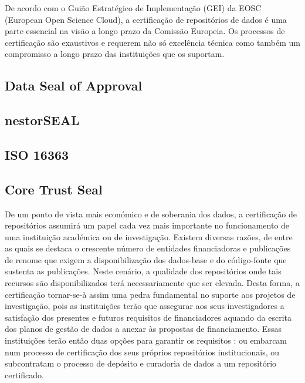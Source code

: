 \documentclass[sigconf,nonacm]{acmart}
\begin{document}
De acordo com o Guião Estratégico de Implementação (GEI) da EOSC (European Open Science Cloud), a certificação de repositórios de dados é uma parte essencial na visão a longo prazo da Comissão Europeia. Os processos de certificação são exaustivos e requerem não só excelência técnica como também um compromisso a longo prazo das instituições que os suportam. 

\subsection{Data Seal of Approval} %
\label{sub:data_seal_of_approval}


\subsection{nestorSEAL} %
\label{sub:nestorseal}


\subsection{ISO 16363} %
\label{sub:iso_16363}


\subsection{Core Trust Seal} %
\label{sub:core_trust_seal}



De um ponto de vista mais económico e de soberania dos dados, a certificação de repositórios assumirá um papel cada vez mais importante no funcionamento de uma instituição académica ou de investigação. Existem diversas razões, de entre as quais se destaca o crescente número de entidades financiadoras e publicações de renome que exigem a disponibilização dos dados-base e do código-fonte que sustenta as publicações. Neste cenário, a qualidade dos repositórios onde tais recursos são disponibilizados terá necessariamente que ser elevada. Desta forma, a certificação tornar-se-à assim uma pedra fundamental no suporte aos projetos de investigação, pois as instituições terão que assegurar aos seus investigadores a satisfação dos presentes e futuros requisitos de financiadores aquando da escrita dos planos de gestão de dados a anexar às propostas de financiamento. Essas instituições terão então duas opções para garantir os requisitos : ou embarcam num processo de certificação dos seus próprios repositórios institucionais, ou subcontratam o processo de depósito e curadoria de dados a um repositório certificado. 
\end{document}
